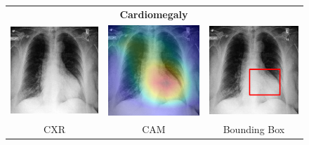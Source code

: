 \begin{figure}[htbp!]
\centering
\begin{tabular}{ccc}
 &\textbf{Cardiomegaly}& \\
\vspace{2mm}
  \includegraphics[width=35mm]{Tesi/images/CAMs/CAM6/image.png} &   
  \includegraphics[width=35mm]{Tesi/images/CAMs/CAM6/image_cam.png} &   
  \includegraphics[width=35mm]{Tesi/images/CAMs/CAM6/image_bbox.png} \\
\footnotesize{CXR} & \footnotesize{CAM} & \footnotesize{Bounding Box} \\[6pt]
\end{tabular}
\caption[Cadiomegaly CAM-1]{}
\label{fig:figure_5.20}
\end{figure}


